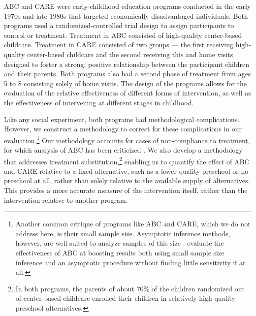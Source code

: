 ABC and CARE were early-childhood education programs conducted in the early 1970s and late 1980s that targeted economically disadvantaged individuals. Both programs used a randomized-controlled trial design to assign participants to control or treatment. Treatment in ABC consisted of high-quality center-based childcare. Treatment in CARE consisted of two groups –-- the first receiving high-quality center-based childcare and the second receiving this and home visits designed to foster a strong, positive relationship between the participant children and their parents. Both programs also had a second phase of treatment from ages 5 to 8 consisting solely of home visits. The design of the programs allows for the evaluation of the relative effectiveness of different forms of intervention, as well as the effectiveness of intervening at different stages in childhood.  

Like any social experiment, both programs had methodological complications. However, we construct a methodology to correct for these complications in our evaluation.\footnote{Another common critique of programs like ABC and CARE, which we do not address here, is their small sample size. Asymptotic inference methods, however, are well suited to analyze samples of this size \citep{Hanushek_Lindseth_2009_BOOKSchoolhousesCourthouses}. \citet{Campbell_Conti_etal_2014_EarlyChildhoodInvestments} evaluate the effectiveness of ABC at boosting results both using small sample size inference and an asymptotic procedure without finding little sensitivity if at all.} Our methodology accounts for cases of non-compliance to treatment, for which analysis of ABC has been criticized \citep{Hu_2014_ABC-Study}.
We also develop a methodology that addresses treatment substitution,\footnote{In both programs, the parents of about 70\% of the children randomized out of center-based childcare enrolled their children in relatively high-quality preschool alternatives.} enabling us to quantify the effect of ABC and CARE relative to a fixed alternative, such as a lower quality preschool or no preschool at all, rather than solely relative to the available supply of alternatives. This provides a more accurate measure of the intervention itself, rather than the intervention relative to another program.


